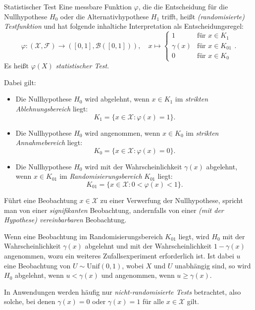 \begin{defi}{Statistischer Test}
    Eine messbare Funktion $\varphi$, die die Entscheidung für die Nullhypothese $H_0$ oder die Alternativhypothese $H_1$ trifft, heißt \emph{(randomisierte) Testfunktion} und hat folgende inhaltiche Interpretation als Entscheidungsregel:
    \[
        \varphi: (\mathcal{X}, \mathcal{F}) \to ([0, 1], \mathcal{B}([0, 1])), \quad x \mapsto \begin{cases}
            1         & \text{für } x \in K_1    \\
            \gamma(x) & \text{für } x \in K_{01} \\
            0         & \text{für } x \in K_0
        \end{cases}.
    \]
    Es heißt $\varphi(X)$ \emph{statistischer Test}.

    Dabei gilt:
    \begin{itemize}
        \item Die Nullhypothese $H_0$ wird abgelehnt, wenn $x \in K_1$ im \emph{strikten Ablehnungsbereich} liegt:
              \[
                  K_1 = \{x \in \mathcal{X} : \varphi(x) = 1\}.
              \]
        \item Die Nullhypothese $H_0$ wird angenommen, wenn $x \in K_0$ im \emph{strikten Annahmebereich} liegt:
              \[
                  K_0 = \{x \in \mathcal{X} : \varphi(x) = 0\}.
              \]
        \item Die Nullhypothese $H_0$ wird mit der Wahrscheinlichkeit $\gamma(x)$ abgelehnt, wenn $x \in K_{01}$ im \emph{Randomisierungsbereich} $K_{01}$ liegt:
              \[
                  K_{01} = \{x \in \mathcal{X} : 0 < \varphi(x) < 1\}.
              \]
    \end{itemize}

    Führt eine Beobachtung $x \in \mathcal{X}$ zu einer Verwerfung der Nullhypothese, spricht man von einer \emph{signifikanten} Beobachtung, andernfalls von einer \emph{(mit der Hypothese) vereinbarbaren} Beobachtung.

    Wenn eine Beobachtung im Randomisierungsbereich $K_{01}$ liegt, wird $H_0$ mit der Wahrscheinlichkeit $\gamma(x)$ abgelehnt und mit der Wahrscheinlichkeit $1 - \gamma(x)$ angenommen, wozu ein weiteres Zufallsexperiment erforderlich ist.
    Ist dabei $u$ eine Beobachtung von $U \sim \text{Unif}(0, 1)$, wobei $X$ und $U$ unabhängig sind, so wird $H_0$ abgelehnt, wenn $u < \gamma(x)$ und angenommen, wenn $u \geq \gamma(x)$.

    In Anwendungen werden häufig nur \emph{nicht-randomisierte Tests} betrachtet, also solche, bei denen $\gamma(x) = 0$ oder $\gamma(x) = 1$ für alle $x \in \mathcal{X}$ gilt.
\end{defi}


